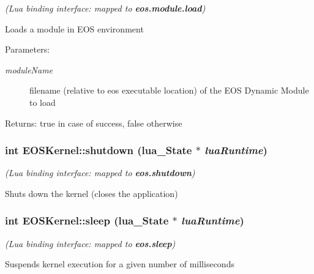 {\em (Lua binding interface: mapped to {\bf eos.module.load})\/}\par
\par
 Loads a module in EOS environment 

\begin{Desc}
\item[Parameters:]
\begin{description}
\item[{\em moduleName}]filename (relative to eos executable location) of the EOS Dynamic Module to load \end{description}
\end{Desc}
\begin{Desc}
\item[Returns:]true in case of success, false otherwise \end{Desc}
\hypertarget{structEOSKernel_5818cdf156babf931c7203339d6ee8ac}{
\subsubsection[{shutdown}]{\setlength{\rightskip}{0pt plus 5cm}int EOSKernel::shutdown (lua\_\-State $\ast$ {\em luaRuntime})}}
\label{structEOSKernel_5818cdf156babf931c7203339d6ee8ac}


{\em (Lua binding interface: mapped to {\bf eos.shutdown})\/}\par
\par
 Shuts down the kernel (closes the application) 

\hypertarget{structEOSKernel_b1d4a0583d293c85eaec6d645aa073de}{
\subsubsection[{sleep}]{\setlength{\rightskip}{0pt plus 5cm}int EOSKernel::sleep (lua\_\-State $\ast$ {\em luaRuntime})}}
\label{structEOSKernel_b1d4a0583d293c85eaec6d645aa073de}


{\em (Lua binding interface: mapped to {\bf eos.sleep})\/}\par
\par
 Suspends kernel execution for a given number of milliseconds 


